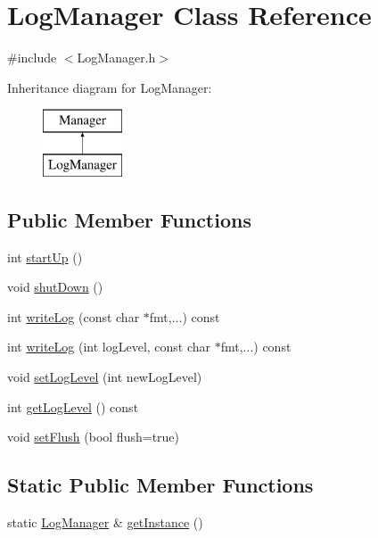 \hypertarget{class_log_manager}{\section{Log\+Manager Class Reference}
\label{class_log_manager}
}


{\ttfamily \#include $<$Log\+Manager.\+h$>$}

Inheritance diagram for Log\+Manager\+:\begin{figure}[H]
\begin{center}
\leavevmode
\includegraphics[height=2.000000cm]{class_log_manager}
\end{center}
\end{figure}
\subsection*{Public Member Functions}
\begin{DoxyCompactItemize}
\item 
int \hyperlink{class_log_manager_a61c2443f3923240ba6e7b74f89c4a50f}{start\+Up} ()
\item 
void \hyperlink{class_log_manager_a60520b802277e79880e78444d92dae93}{shut\+Down} ()
\item 
int \hyperlink{class_log_manager_a06b055d8fe1aef0f8b8cba3053f2d1ec}{write\+Log} (const char $\ast$fmt,...) const 
\item 
int \hyperlink{class_log_manager_a400f99a653cb542aa5e593cba35dd206}{write\+Log} (int log\+Level, const char $\ast$fmt,...) const 
\item 
void \hyperlink{class_log_manager_a94de253f71c67724e0b6de232129337a}{set\+Log\+Level} (int new\+Log\+Level)
\item 
int \hyperlink{class_log_manager_ae4bef18289c9990a2a0b9f58bc4c5470}{get\+Log\+Level} () const 
\item 
void \hyperlink{class_log_manager_abc6b0c8d7dd9fcb744540f9d18701563}{set\+Flush} (bool flush=true)
\end{DoxyCompactItemize}
\subsection*{Static Public Member Functions}
\begin{DoxyCompactItemize}
\item 
static \hyperlink{class_log_manager}{Log\+Manager} \& \hyperlink{class_log_manager_acd81e87b2d62ce40fceefcc55c4310ae}{get\+Instance} ()
\end{DoxyCompactItemize}


